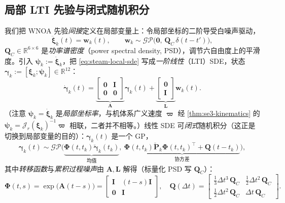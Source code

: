 \subsection{局部 LTI 先验与闭式随机积分}
\label{sec:est-steam-prior}

我们把 WNOA 先验\emph{间接}定义在局部变量上：令局部坐标的二阶导受白噪声驱动，
\begin{equation}
  \ddot{\boldsymbol{\xi}}_k(t)=\mathbf{w}_k(t),\qquad \mathbf{w}_k\sim\mathcal{GP}\big(\mathbf{0},\,\mathbf{Q}_C\,\delta(t-t')\big),
  \label{eq:steam-local-sde}
\end{equation}
$\mathbf{Q}_C\in\mathbb{R}^{6\times6}$ 是\emph{功率谱密度}（power spectral density, PSD），调节六自由度上的平滑度。引入 $\boldsymbol{\psi}_k:=\dot{\boldsymbol{\xi}}_k$，把 \cref{eq:steam-local-sde} 写成\emph{一阶线性}（LTI）SDE，状态 $\boldsymbol{\gamma}_k:=[\boldsymbol{\xi}_k;\boldsymbol{\psi}_k]\in\mathbb{R}^{12}$：
\begin{equation}
  \dot{\boldsymbol{\gamma}}_k(t)
  =\underbrace{\begin{bmatrix}\mathbf{0}&\mathbf{I}\\\mathbf{0}&\mathbf{0}\end{bmatrix}}_{\mathbf{A}}\boldsymbol{\gamma}_k(t)
  +\underbrace{\begin{bmatrix}\mathbf{0}\\\mathbf{I}\end{bmatrix}}_{\mathbf{L}}\mathbf{w}_k(t).
  \label{eq:steam-lti}
\end{equation}
（注意 $\boldsymbol{\psi}_k=\dot{\boldsymbol{\xi}}_k$ 是\emph{局部坐标率}，与机体系广义速度 $\boldsymbol{\varpi}$ 经 \cref{thm:se3-kinematics} 的 $\boldsymbol{\psi}_k=\boldsymbol{\mathcal{J}}_r(\boldsymbol{\xi}_k)^{-1}\boldsymbol{\varpi}$ 相联，二者并不相等。）线性 SDE 可\emph{闭式}随机积分（这正是切换到局部变量的目的）：$\boldsymbol{\gamma}_k(t)$ 是一个 GP，
\begin{equation}
  \boldsymbol{\gamma}_k(t)\sim\mathcal{GP}\Big(\underbrace{\boldsymbol{\Phi}(t,t_k)\check{\boldsymbol{\gamma}}_k(t_k)}_{\text{均值}},\ \underbrace{\boldsymbol{\Phi}(t,t_k)\check{\mathbf{P}}_k\boldsymbol{\Phi}(t,t_k)^\top+\mathbf{Q}(t-t_k)}_{\text{协方差}}\Big),
  \label{eq:steam-gp}
\end{equation}
其中\emph{转移函数}与\emph{累积过程噪声}由 $\mathbf{A},\mathbf{L}$ 解得（标量化 PSD 写 $\mathbf{Q}_C$）：
\begin{equation}
  \boldsymbol{\Phi}(t,s)=\exp\!\big(\mathbf{A}(t-s)\big)=\begin{bmatrix}\mathbf{I}&(t-s)\mathbf{I}\\\mathbf{0}&\mathbf{I}\end{bmatrix},\quad
  \mathbf{Q}(\Delta t)=\begin{bmatrix}\tfrac13\Delta t^3\,\mathbf{Q}_C&\tfrac12\Delta t^2\,\mathbf{Q}_C\\[2pt]\tfrac12\Delta t^2\,\mathbf{Q}_C&\Delta t\,\mathbf{Q}_C\end{bmatrix}.
  \label{eq:steam-Phi-Q}
\end{equation}

